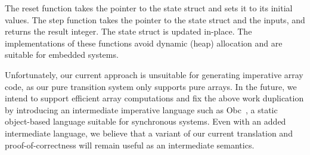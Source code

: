 The reset function takes the pointer to the state struct and sets it to its initial values.
The step function takes the pointer to the state struct and the inputs, and returns the result integer.
The state struct is updated in-place.
The implementations of these functions avoid dynamic (heap) allocation and are suitable for embedded systems.


Unfortunately, our current approach is unsuitable for generating imperative array code, as our pure transition system only supports pure arrays.
In the future, we intend to support efficient array computations and fix the above work duplication by introducing an intermediate imperative language such as Obc~\cite{biernacki2008clock}, a static object-based language suitable for synchronous systems.
Even with an added intermediate language, we believe that a variant of our current translation and proof-of-correctness will remain useful as an intermediate semantics.

